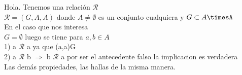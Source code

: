 \documentclass[11pt,letterpaper]{article}
\begin{document}
    Hola.
    Tenemos una relación $\mathcal{R}$ \\

    $\mathcal{R}=(G,A,A) $ \textbraceleft donde  $A \neq \emptyset $ es un conjunto cualquiera y  \textbraceright $G\subset A\timesA$ \\

    En el caso que nos interesa \\

    $G=\emptyset$ luego se tiene para $a,b \in A$ \\

    1) a \textbraceleft $\mathcal{R}$ \textbraceright  a  \textbraceleft ya que \textbraceright (a,a)\not\in G \\
    2) a  $\mathcal{R}$ b  $\Rightarrow$ b  $\mathcal{R}$ a  \textbraceleft por ser el antecedente falso la implicacion es verdadera \textbraceright \\

    Las demás propiedades, las hallas de la misma manera.
\end{document}
